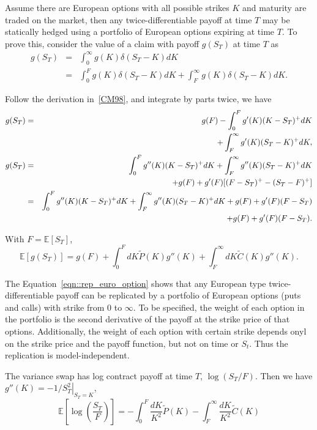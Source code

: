 \documentclass[11pt,reqno,final]{amsart}
\begin{document}
Assume there are European options with all possible strikes $K$ and maturity are traded on the market, then any twice-differentiable payoff at time $T$ may be statically hedged using a portfolio of European options expiring at time $T$. To prove this, consider the value of a claim with payoff $g(S_T)$ at time $T$ as
\begin{eqnarray*}
g(S_T) &=& \int_0^{\infty} g(K)\delta(S_T-K)dK \\
       &=& \int_0^{F} g(K)\delta(S_T-K)dK + \int_F^{\infty} g(K)\delta(S_T-K)dK.
\end{eqnarray*}

Follow the derivation in~\ref{CM98}, and integrate by parts twice, we have
\begin{eqnarray}
g(S_T) &=& g(F) - \int_0^{F} g'(K)(K-S_T)^{+}dK \notag \\
       & & + \int_F^{\infty} g'(K)(S_T-K)^{+} dK, \notag \\
g(S_T) &=& \int_0^{F} g''(K)(K-S_T)^{+}dK + \int_F^{\infty} g''(K)(S_T-K)^{+} dK \notag \\
       & & + g(F) + g'(F)[(F-S_T)^{+} - (S_T-F)^{+}] \notag \\
       &=& \int_0^{F} g''(K)(K-S_T)^{+}dK + \int_F^{\infty} g''(K)(S_T-K)^{+} dK + g(F) + g'(F)(F-S_T) \notag \\
       & & +g(F) +g'(F)(F-S_T). \label{eqn::rep_euro_option}
\end{eqnarray}

With $F=\mathbb{E}[S_T]$,
$$
\mathbb{E}[g(S_T)] = g(F)+\int_0^{F}dK \tilde{P}(K)g''(K) + \int_{F}^{\infty} dK \tilde{C} (K) g''(K).
$$

The Equation~\ref{eqn::rep_euro_option} shows that any European type twice-differentiable payoff can be replicated by a portfolio of European options (puts and calls) with strike from 0 to $\infty$. To be specified, the weight of each option in the portfolio is the second derivative of the payoff at the strike price of that options. Additionally, the weight of each option with certain strike depends onyl on the strike price and the payoff function, but not on time or $S_t$. Thus the replication is model-independent. 

The variance swap has log contract payoff at time $T$, $\log(S_T/F)$. Then we have $g''(K) \left. =-1/S_T^2 \right|_{S_T=K}$,
$$
\mathbb{E}\left[ \log\left(\frac{S_T}{F}\right)\right] = -\int_0^F \frac{dK}{K^2} \tilde{P}(K) - \int_F^{\infty} \frac{dK}{K^2} \tilde{C}(K)
$$
\end{document}
